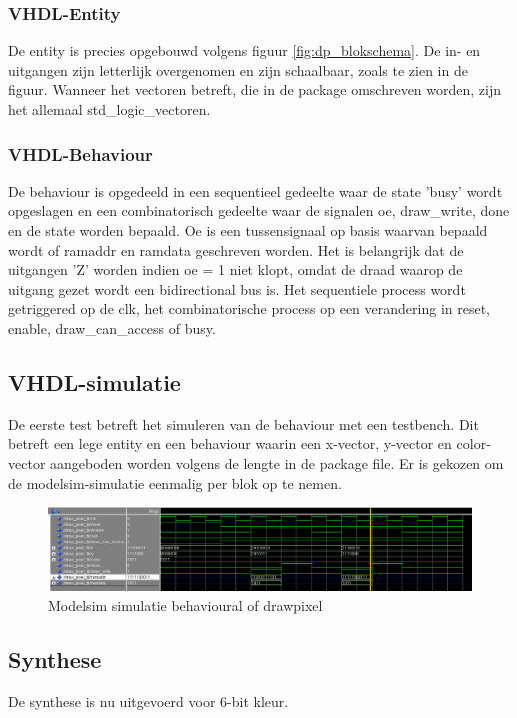 \documentclass{scrartcl} %
\begin{document}
\subsubsection{VHDL-Entity}
De entity is precies opgebouwd volgens  figuur  \ref{fig:dp_blokschema}. De in- en uitgangen zijn letterlijk overgenomen en zijn schaalbaar, zoals te zien in de figuur. Wanneer het vectoren betreft, die in de package omschreven worden, zijn het allemaal std\_logic\_vectoren. 

\subsubsection{VHDL-Behaviour}
De behaviour is opgedeeld in een sequentieel gedeelte waar de state 'busy' wordt opgeslagen en een combinatorisch gedeelte waar de signalen oe, draw\_write, done en de state worden bepaald. Oe is een tussensignaal op basis waarvan bepaald wordt of ramaddr en ramdata geschreven worden. Het is belangrijk dat de uitgangen 'Z' worden indien oe = 1 niet klopt, omdat de draad waarop de uitgang gezet wordt een bidirectional bus is. Het sequentiele process wordt getriggered op de clk, het combinatorische process op een verandering in reset, enable, draw\_can\_access of busy. 

\subsection{VHDL-simulatie}
De eerste test betreft het simuleren van de behaviour met een testbench. Dit betreft een lege entity en een behaviour waarin een x-vector, y-vector en color-vector aangeboden worden volgens de lengte in de package file. Er is gekozen om de modelsim-simulatie eenmalig per blok op te nemen. 
\begin{figure} [h!]
\centering
\includegraphics [scale = 0.7] {resource/dp_sim}
\caption{Modelsim simulatie behavioural of drawpixel}
\label{fig:dp_sim}
\end{figure}

\subsection{Synthese}
De synthese is nu uitgevoerd voor 6-bit kleur. 
\end{document}
